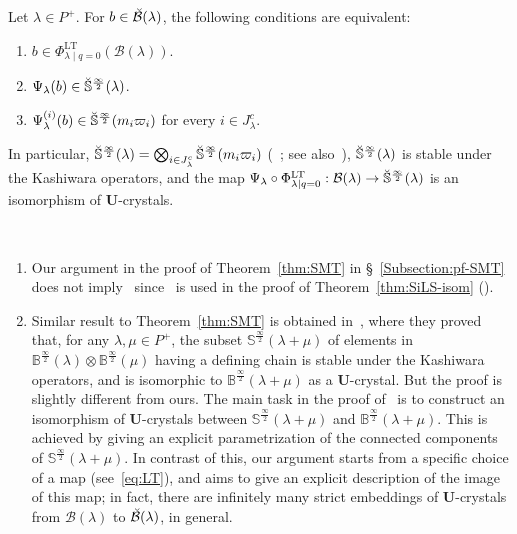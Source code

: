 \documentclass[ALCO,ThmDefs,Unicode,epreuves]{cedram}
\renewcommand{\U}{\mathbf{U}}
\newcommand{\si}{\frac{\infty}{2}}
\DeclareMathOperator{\LT}{LT}
\begin{document}
\goodbreak
\begin{theo} \label{thm:SMT}
Let $\lambda \in P^+$. 
For $b \in \Breve{\mathcal{B}}(\lambda)$, 
the following conditions are equivalent:
\begin{enumerate}[label=(\arabic*)]
\item\label{Theo3.4_1}
$b \in \Phi_{\lambda \mid q=0}^{\LT }(\mathcal{B}(\lambda))$.
\item\label{Theo3.4_2}
$\Psi_{\lambda}(b) \in \Breve{\mathbb{S}}^{\si}(\lambda)$. 
\item\label{Theo3.4_3}
$\Psi_{\lambda}^{(i)}(b) \in \Breve{\mathbb{S}}^{\si}(m_i \varpi_i)$
for every $i \in J_{\lambda}^c$.
\end{enumerate}
In particular, 
$\Breve{\mathbb{S}}^{\si}(\lambda) = \bigotimes_{i \in J_{\lambda}^c}\Breve{\mathbb{S}}^{\si}(m_i \varpi_i)$ 
(\cf~\cite[Remark~4.17]{BN04}; see also~\cite[Conjecture~13.1~(iii)]{K02}), 
$\Breve{\mathbb{S}}^{\si}(\lambda)$ 
is stable under the Kashiwara operators, 
and the map 
$\Psi_{\lambda} \circ \Phi_{\lambda \mid q=0}^{\LT } : \mathcal{B}(\lambda) \rightarrow \Breve{\mathbb{S}}^{\si}(\lambda)$ 
is an isomorphism of $\U$-crystals.
\end{theo}

\goodbreak
\begin{rema}\ \\[-1.2em]
\begin{enumerate}[label=(\arabic*)]
\item\label{Rema3.5_1}
Our argument in the proof of Theorem~\ref{thm:SMT} in \S~\ref{Subsection:pf-SMT} 
does not imply~\cite[Conjecture~13.1~(iii)]{K02} 
since~\cite[Remark~4.17]{BN04}
is used in the proof of 
Theorem~\ref{thm:SiLS-isom}
(\cite[Theorems~3.1.5 and~3.2.1]{INS16}). 
\item\label{Rema3.5_2}
Similar result to Theorem~\ref{thm:SMT} is obtained in~\cite[Theorem~3.1]{KNS}, 
where they proved that, 
for any $\lambda , \mu \in P^+$, 
the subset 
$\mathbb{S}^{\si}(\lambda + \mu)$
of elements in 
$\mathbb{B}^{\si}(\lambda) \otimes \mathbb{B}^{\si}(\mu)$
having a defining chain is stable under the Kashiwara operators, 
and is isomorphic to 
$\mathbb{B}^{\si}(\lambda + \mu)$
as a $\U$-crystal. 
But the proof is slightly different from ours.
The main task in the proof of~\cite[Theorem~3.1]{KNS}
is to construct an isomorphism of $\U$-crystals between 
$\mathbb{S}^{\si}(\lambda + \mu)$
and 
$\mathbb{B}^{\si}(\lambda + \mu)$.
This is achieved by giving an explicit parametrization of the 
connected components of $\mathbb{S}^{\si}(\lambda + \mu)$.
In contrast of this, our argument starts from a specific choice of a map (see~\eqref{eq:LT}), 
and aims to give an explicit description of the image of this map; 
in fact, there are infinitely many strict embeddings of $\U$-crystals from
$\mathcal{B}(\lambda)$
to
$\Breve{\mathcal{B}}(\lambda)$, 
in general.
\end{enumerate}
\end{rema}
\end{document}
